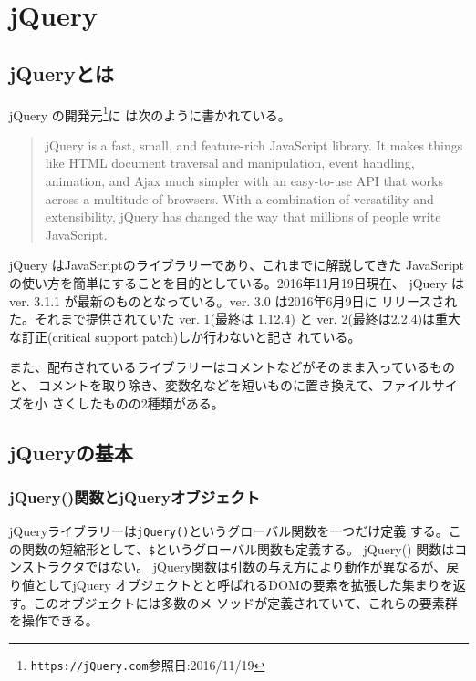 \chapter{jQuery}
\section{jQueryとは}
jQuery の開発元\footnote{\texttt{https://jQuery.com}参照日:2016/11/19}に
は次のように書かれている。
\begin{quotation}
jQuery is a fast, small, and feature-rich JavaScript library. It makes
 things like HTML document traversal and manipulation, event handling,
 animation, and Ajax much simpler with an easy-to-use API that works
 across a multitude of browsers. With a combination of versatility and
 extensibility, jQuery has changed the way that millions of people write
 JavaScript.
 \end{quotation}
jQuery はJavaScriptのライブラリーであり、これまでに解説してきた
JavaScriptの使い方を簡単にすることを目的としている。2016年11月19日現在、
jQuery は ver. 3.1.1 が最新のものとなっている。ver. 3.0 は2016年6月9日に
リリースされた。それまで提供されていた ver. 1(最終は 1.12.4) と
ver. 2(最終は2.2.4)は重大な訂正(critical support patch)しか行わないと記さ
れている。

また、配布されているライブラリーはコメントなどがそのまま入っているものと、
コメントを取り除き、変数名などを短いものに置き換えて、ファイルサイズを小
さくしたものの2種類がある。
\newcommand{\FuncRef}[1]{%
\refstepcounter{Func}\label{#1}({\bfseries 機能\arabic{Func}})}
\section{jQueryの基本}
\subsection{jQuery()関数とjQueryオブジェクト}
jQueryライブラリーは\texttt{jQuery()}というグローバル関数を一つだけ定義
する。この関数の短縮形として、\texttt{\$}というグローバル関数も定義する。
jQuery() 関数はコンストラクタではない。
jQuery関数は引数の与え方により動作が異なるが、戻り値としてjQuery
オブジェクトとと呼ばれるDOMの要素を拡張した集まりを返す。このオブジェクトには多数のメ
ソッドが定義されていて、これらの要素群を操作できる。

